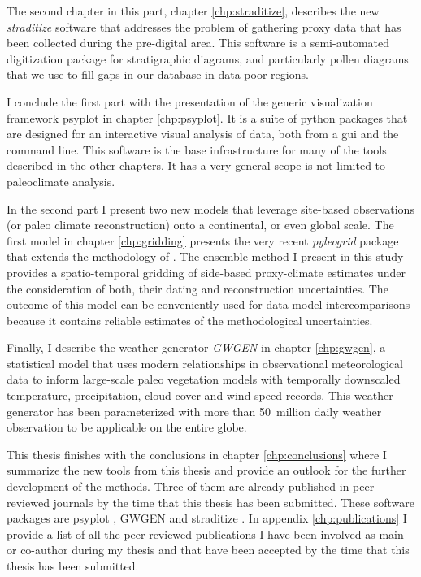 \documentclass[
11pt, %
english, %
singlespacing, %
headsepline, %
]{MastersDoctoralThesis} %
\begin{document}
\begin{NoHyper}
\begin{refsection}
The second chapter in this part, chapter \ref{chp:straditize}, describes the new \textit{straditize} software that addresses the problem of gathering proxy data that has been collected during the pre-digital area. This software is a semi-automated digitization package for stratigraphic diagrams, and particularly pollen diagrams that we use to fill gaps in our database in data-poor regions.

I conclude the first part with the presentation of the generic visualization framework psyplot in chapter \ref{chp:psyplot}. It is a suite of python packages that are designed for an interactive visual analysis of data, both from a \gls{gui} and the command line. This software is the base infrastructure for many of the tools described in the other chapters. It has a very general scope is not limited to paleoclimate analysis.

In the \hyperref[part:models]{second part} I present two new models that leverage site-based observations (or paleo climate reconstruction) onto a continental, or even global scale. The first model in chapter \ref{chp:gridding} presents the very recent \textit{pyleogrid} package that extends the methodology of \citep{MauriDavisCollinsEtAl2015}. The ensemble method I present in this study provides a spatio-temporal gridding of side-based proxy-climate estimates under the consideration of both, their dating and reconstruction uncertainties. The outcome of this model can be conveniently used for data-model intercomparisons because it contains reliable estimates of the methodological uncertainties.

Finally, I describe the weather generator \textit{GWGEN} in chapter \ref{chp:gwgen}, a statistical model that uses modern relationships in observational meteorological data to inform large-scale paleo vegetation models with temporally downscaled temperature, precipitation, cloud cover and wind speed records. This weather generator has been parameterized with more than 50~million daily weather observation to be applicable on the entire globe.

This thesis finishes with the conclusions in chapter \ref{chp:conclusions} where I summarize the new tools from this thesis and provide an outlook for the further development of the methods. Three of them are already published in peer-reviewed journals by the time that this thesis has been submitted. These software packages are psyplot \citep{Sommer2017}, GWGEN \citep{SommerKaplan2017b} and straditize \citep{SommerRechChevalierEtAl2019}. In appendix \ref{chp:publications} I provide a list of all the peer-reviewed publications I have been involved as main or co-author during my thesis and that have been accepted by the time that this thesis has been submitted.


\end{refsection}
\end{NoHyper}
\end{document}
